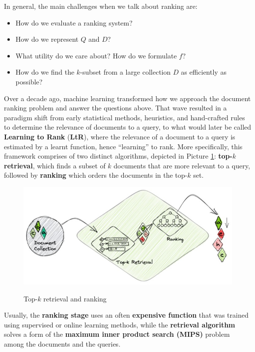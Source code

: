In general, the main challenges when we talk about ranking are:

\begin{itemize}
    \item How do we evaluate a ranking system?
    \item How do we represent $Q$ and $D$?
    \item What utility do we care about? How do we formulate $f$?
    \item How do we find the $k$-subset from a large collection $D$ as efficiently as possible?
\end{itemize}

Over a decade ago, machine learning transformed how we approach the document ranking problem and answer the questions above. That wave resulted in a paradigm shift from early statistical methods, heuristics, and hand-crafted rules to determine the relevance of documents to a query, to what would later be called \textbf{Learning to Rank} (\textbf{LtR}), where the relevance of a document to a query is estimated by a learnt function, hence “learning” to rank. More specifically, this framework comprises of two distinct algorithms, depicted in Picture \ref{ltr}: \textbf{top-$k$ retrieval}, which finds a subset of $k$ documents that are more relevant to a query, followed by \textbf{ranking} which orders the documents in the top-$k$ set.

\begin{figure}[h!]
		\centering
		\includegraphics[scale = 1.6]{img/LtR framework.jpg}
        \label{ltr}
        \caption{Top-$k$ retrieval and ranking}
\end{figure}

Usually, the \textbf{ranking stage} uses an often \textbf{expensive function} that was trained using supervised or online learning methods, while the \textbf{retrieval algorithm} solves a form of the \textbf{maximum inner product search (MIPS)} problem among the documents and the queries.

